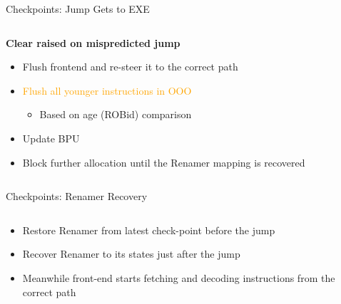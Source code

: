 \documentclass[aspectratio=169,12pt]{beamer}
\begin{document}
\begin{frame}{Checkpoints: Jump Gets to EXE}
    \centering
    
    
    \vspace{0.5cm}
    \begin{columns}[T]
        \begin{column}{0.9\textwidth}
            \textbf{Clear raised on mispredicted jump}
            \begin{itemize}
                \item Flush frontend and re-steer it to the correct path
                \item \textcolor{orange}{Flush all younger instructions in OOO}
                \begin{itemize}
                    \item Based on age (ROBid) comparison
                \end{itemize}
                \item Update BPU
                \item Block further allocation until the Renamer mapping is recovered
            \end{itemize}
        \end{column}
    \end{columns}
\end{frame}

\begin{frame}{Checkpoints: Renamer Recovery}
    \centering
    
    \vspace{0.5cm}
    \begin{columns}[T]
        \begin{column}{0.9\textwidth}
            \begin{itemize}
                \item Restore Renamer from latest check-point before the jump
                \item Recover Renamer to its states just after the jump
                \item Meanwhile front-end starts fetching and decoding instructions from the correct path
            \end{itemize}
        \end{column}
    \end{columns}
\end{frame}
\end{document}
